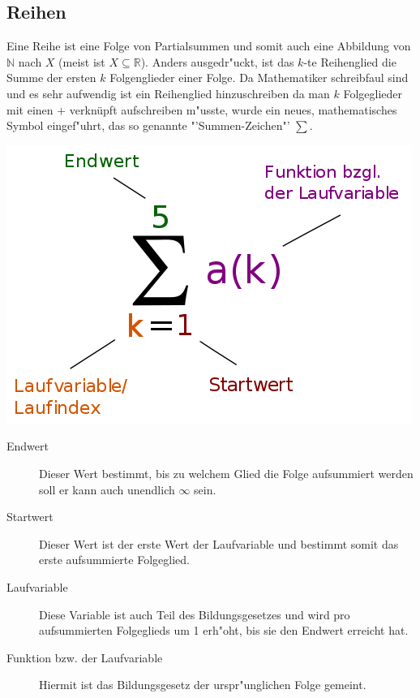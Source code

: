 \subsection{Reihen}
Eine Reihe ist eine Folge von Partialsummen und somit auch eine Abbildung von $\mathbb{N}$ nach $X$ (meist ist $X \subseteq \mathbb{R}$). Anders ausgedr"uckt, ist das $k$-te Reihenglied die Summe der ersten $k$ Folgenglieder einer Folge. Da Mathematiker schreibfaul sind und es sehr aufwendig ist ein Reihenglied hinzuschreiben da man $k$ Folgeglieder mit einen $+$ verknüpft aufschreiben m"usste, wurde ein neues, mathematisches Symbol eingef"uhrt, das so genannte "'Summen-Zeichen"' $\sum$.
\begin{minipage}{7 cm}
\includegraphics[width = 7 cm]{pictures/summe}
\begin{description}
\item[Endwert] Dieser Wert bestimmt, bis zu welchem Glied die Folge aufsummiert werden soll er kann auch unendlich $\infty$ sein.
\end{description}
\end{minipage}
\begin{minipage}{7 cm}
\begin{description}
\item[Startwert] Dieser Wert ist der erste Wert der Laufvariable und bestimmt somit das erste aufsummierte Folgeglied.
\item[Laufvariable] Diese Variable ist auch Teil des Bildungsgesetzes und wird pro aufsummierten Folgeglieds um 1 erh"oht, bis sie den Endwert erreicht hat.
\item[Funktion bzw. der Laufvariable] Hiermit ist das Bildungsgesetz der urspr"unglichen Folge gemeint.
\end{description}
\end{minipage}

